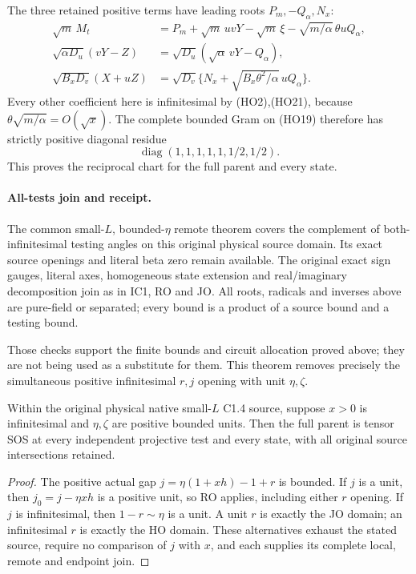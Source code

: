 The three retained positive terms have leading roots
$P_m,-Q_\alpha,N_x$:
\[
 \begin{aligned}
 \sqrt m\,M_t&=P_m+\sqrt m\,uvY-\sqrt m\,\xi
                  -\sqrt{m/\alpha}\,\theta uQ_\alpha,\\
 \sqrt{\alpha D_u}(vY-Z)
             &=\sqrt{D_u}(\sqrt\alpha\,vY-Q_\alpha),\\
 \sqrt{B_xD_v}(X+uZ)
             &=\sqrt{D_v}\{N_x+
                      \sqrt{B_x\theta^2/\alpha}\,uQ_\alpha\}.
 \end{aligned}
 \tag{HO23}
\]
Every other coefficient here is infinitesimal by (HO2),(HO21),
because $\theta\sqrt{m/\alpha}=O(\sqrt x)$.
The complete bounded Gram on (HO19) therefore has strictly positive
diagonal residue
\[
             \operatorname{diag}(1,1,1,1,1,1/2,1/2).
 \tag{HO24}
\]
This proves the reciprocal chart for the full parent and every state.

\paragraph{All-tests join and receipt.}
The common small-$L$, bounded-$\eta$ remote theorem covers the
complement of both-infinitesimal testing angles on this original
physical source domain. Its exact source openings and literal beta
zero remain available. The original exact sign gauges, literal axes,
homogeneous state extension and real/imaginary decomposition join
as in IC1, RO and JO. All roots, radicals and inverses above are
pure-field or separated; every bound is a product of a source bound
and a testing bound.

Those checks support the finite bounds and circuit allocation proved
above; they are not being used as a substitute for them.
This theorem removes precisely the simultaneous positive
infinitesimal $r,j$ opening with unit $\eta,\zeta$.

\begin{corollary}
Within the original physical native small-$L$ C1.4 source, suppose
$x>0$ is infinitesimal and $\eta,\zeta$ are positive bounded units.
Then the full parent is tensor SOS at every independent projective
test and every state, with all original source intersections retained.
\end{corollary}
\begin{proof}
The positive actual gap $j=\eta(1+xh)-1+r$ is bounded.
If $j$ is a unit, then $j_0=j-\eta xh$ is a positive unit,
so RO applies, including either $r$ opening. If $j$ is infinitesimal,
then $1-r\sim\eta$ is a unit. A unit $r$ is exactly the JO domain;
an infinitesimal $r$ is exactly the HO domain. These alternatives
exhaust the stated source, require no comparison of $j$ with $x$,
and each supplies its complete local, remote and endpoint join.
\end{proof}



